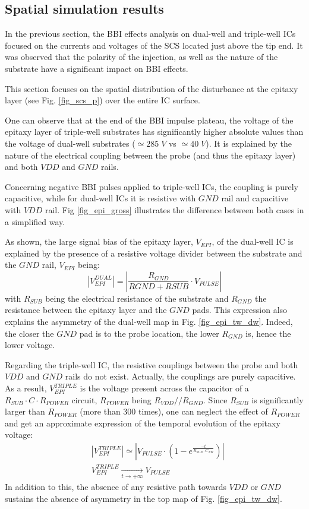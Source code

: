 \documentclass[10pt, conference, compsocconf]{IEEEtran}
\begin{document}
\subsection{Spatial simulation results}
In the previous section, the BBI effects analysis on dual-well and triple-well ICs focused on the currents and voltages of the SCS located just above the tip end. It was observed that the polarity of the injection, as well as the nature of the substrate have a significant impact on BBI effects.

This section focuses on the spatial distribution of the disturbance at the epitaxy layer (see Fig. \ref{fig_scs_p}) over the entire IC surface.

One can observe that at the end of the BBI impulse plateau, the voltage of the epitaxy layer of triple-well substrates has significantly higher absolute values than the voltage of dual-well substrates ($\simeq285\; V$ vs $\simeq40\; V$). It is explained by the nature of the electrical coupling between the probe (and thus the epitaxy layer) and both $VDD$ and $GND$ rails.

Concerning negative BBI pulses applied to triple-well ICs, the coupling is purely capacitive, while for dual-well ICs it is resistive with $GND$ rail and capacitive with $VDD$ rail. Fig \ref{fig_epi_gross} illustrates the difference between both cases in a simplified way.

As shown, the large signal bias of the epitaxy layer, $V_{EPI}$, of the dual-well IC is explained by the presence of a resistive voltage divider between the substrate and the $GND$ rail, $V_{EPI}$ being:
\begin{equation}
\left|V_{EPI}^{DUAL}\right| = \left|\frac{R_{GND}}{R{GND}+R{SUB}} \cdot V_{PULSE}\right|
\end{equation}
with $R_{SUB}$ being the electrical resistance of the substrate and $R_{GND}$ the resistance between the epitaxy layer and the $GND$ pads. This expression also explains the asymmetry of the dual-well map in Fig. \ref{fig_epi_tw_dw}. Indeed, the closer the $GND$ pad is to the probe location, the lower $R_{GND}$ is, hence the lower voltage.

Regarding the triple-well IC, the resistive couplings between the probe and both $VDD$ and $GND$ rails do not exist. Actually, the couplings are purely capacitive. As a result, $V_{EPI}^{TRIPLE}$ is the voltage present across the capacitor of a $R_{SUB} \cdot C \cdot R_{POWER}$ circuit, $R_{POWER}$ being $R_{VDD} // R_{GND}$. Since $R_{SUB}$ is significantly larger than $R_{POWER}$ (more than 300 times), one can neglect the effect of $R_{POWER}$ and get an approximate expression of the temporal evolution of the epitaxy voltage:
\begin{equation}
\begin{split}
&\left|V_{EPI}^{TRIPLE}\right| \simeq \left|V_{PULSE}\cdot(1-e^{\frac{-t}{R_{SUB} \cdot C_{NW}}})\right|
\\
&V_{EPI}^{TRIPLE} \xrightarrow[t \to +\infty]{} V_{PULSE}
\end{split}
\end{equation}
In addition to this, the absence of any resistive path towards $VDD$ or $GND$ sustains the absence of asymmetry in the top map of Fig. \ref{fig_epi_tw_dw}.
\end{document}

